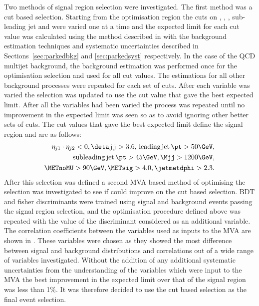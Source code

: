 Two methods of signal region selection were investigated. The first method was a cut based selection. Starting from the optimisation region the cuts on \METsig, \jetmetdphi, \detajj, sub-leading jet \pt and \Mjj were varied one at a time and the expected limit for each cut value was calculated using the method described in  with the background estimation techniques and systematic uncertainties described in Sections~\ref{sec:parkedbkg} and \ref{sec:parkedsyst} respectively. In the case of the \ac{QCD} multijet background, the background estimation was performed once for the optimisation selection and used for all cut values. The estimations for all other background processes were repeated for each set of cuts. After each variable was varied the selection was updated to use the cut value that gave the best expected limit. After all the variables had been varied the process was repeated until no improvement in the expected limit was seen so as to avoid ignoring other better sets of cuts. The cut values that gave the best expected limit define the signal region and are as follows:
\begin{equation}
  \label{eq:parkedsigsel}
  \begin{split}
    \eta_{j1}\cdot\eta_{j2}<0,\detajj>3.6,\,\mathrm{leading\,jet\,\pt}>50 \GeV,\\
    \mathrm{subleading\,jet\,\pt}>45 \GeV, \Mjj>1200 \GeV,\\
    \METnoMU>90 \GeV, \METsig>4.0,\jetmetdphi>2.3.
  \end{split}
\end{equation}
After this selection was defined a second \ac{MVA} based method of optimising the selection was investigated to see if could improve on the cut based selection. \ac{BDT} and fisher %
discriminants were trained using signal and background events passing the signal region selection, and the optimisation procedure defined above was repeated with the value of the discriminant considered as an additional variable. The correlation coefficients between the variables used as inputs to the \ac{MVA} are shown in . These variables were chosen as they showed the most difference between signal and background distributions and correlations out of a wide range of variables investigated. Without the addition of any additional systematic uncertainties from the understanding of the variables which were input to the \ac{MVA} the best improvement in the expected limit over that of the signal region was less than 1\%. It was therefore decided to use the cut based selection as the final event selection.
